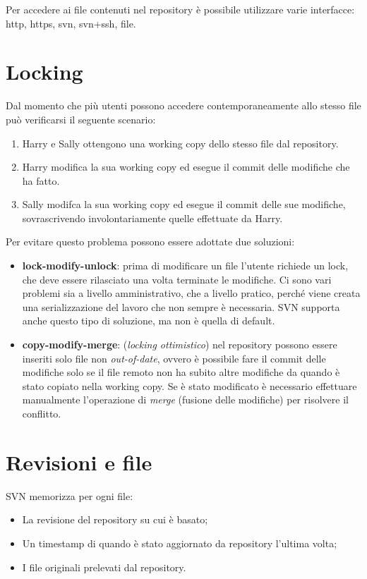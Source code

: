 Per accedere ai file contenuti nel repository è possibile utilizzare varie interfacce: http, https, svn, svn+ssh, file.


\section{Locking}

Dal momento che più utenti possono accedere contemporaneamente allo stesso file può verificarsi il seguente scenario:

\begin{enumerate}
	\item Harry e Sally ottengono una working copy dello stesso file dal repository.
	\item Harry modifica la sua working copy ed esegue il commit delle modifiche che ha fatto.
	\item Sally modifca la sua working copy ed esegue il commit delle sue modifiche, sovrascrivendo involontariamente quelle effettuate da Harry.
\end{enumerate}

Per evitare questo problema possono essere adottate due soluzioni:

\begin{itemize}
	\item \textbf{lock-modify-unlock}: prima di modificare un file l'utente richiede un lock, che deve essere rilasciato una volta terminate le modifiche. Ci sono vari problemi sia a livello amministrativo, che a livello pratico, perché viene creata una serializzazione del lavoro che non sempre è necessaria. SVN supporta anche questo tipo di soluzione, ma non è quella di default.
	\item \textbf{copy-modify-merge}: (\textit{locking ottimistico}) nel repository possono essere inseriti solo file non \textit{out-of-date}, ovvero è possibile fare il commit delle modifiche solo se il file remoto non ha subito altre modifiche da quando è stato copiato nella working copy. Se è stato modificato è necessario effettuare manualmente l'operazione di \textit{merge} (fusione delle modifiche) per risolvere il conflitto.
\end{itemize}

\section{Revisioni e file}

SVN memorizza per ogni file:

\begin{itemize}
\item La revisione del repository su cui è basato;
\item Un timestamp di quando è stato aggiornato da repository l'ultima volta;
\item I file originali prelevati dal repository.
\end{itemize}

